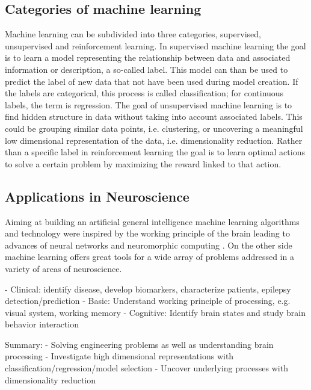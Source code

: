 \subsection{Categories of machine learning}
Machine learning can be subdivided into three categories, supervised, unsupervised and reinforcement learning. In supervised machine learning the goal is to learn a model representing the relationship between data and associated information or description, a so-called label. This model can than be used to predict the label of new data that not have been used during model creation. If the labels are categorical, this process is called classification; for continuous labels, the term is regression. The goal of unsupervised machine learning is to find hidden structure in data without taking into account associated labels. This could be grouping similar data points, i.e. clustering, or uncovering a meaningful low dimensional representation of the data, i.e. dimensionality reduction. Rather than a specific label in reinforcement learning the goal is to learn optimal actions to solve a certain problem by maximizing the reward linked to that action.

\subsection{Applications in Neuroscience}
Aiming at building an artificial general intelligence machine learning algorithms and technology were inspired by the working principle of the brain leading to advances of neural networks \cite{Macpherson2021} and neuromorphic computing \cite{Choi2022}. On the other side machine learning offers great tools for a wide array of problems addressed in a variety of areas of neuroscience. 

- Clinical: identify disease, develop biomarkers, characterize patients, epilepsy detection/prediction
- Basic: Understand working principle of processing, e.g. visual system, working memory
- Cognitive: Identify brain states and study brain behavior interaction

Summary: 
- Solving engineering problems as well as understanding brain processing 
- Investigate high dimensional representations with classification/regression/model selection 
- Uncover underlying processes with dimensionality reduction


